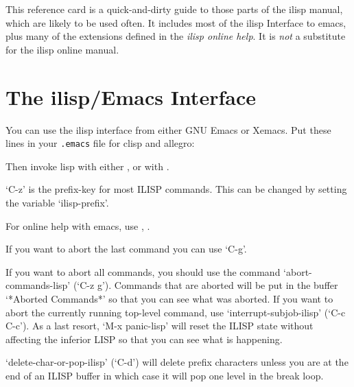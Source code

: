 This reference card is a quick-and-dirty guide to those parts of the
ilisp manual, which are likely to be used often.
It includes most of the ilisp Interface to emacs, plus many of the
extensions defined in the {\it ilisp online help}.  It is {\it not} a
substitute for the ilisp online manual.

\section{The ilisp/Emacs Interface }

You can use the ilisp interface from either GNU Emacs or Xemacs.  
Put these lines in your {\tt .emacs} file for clisp and allegro:


\hskip 25pt 
	 


\hskip 25pt 



\hskip 25pt 


Then invoke lisp with either , 
or with .

`C-z' is the prefix-key for most ILISP commands. This can be changed by 
setting the variable `ilisp-prefix'.

For online help with emacs, use , .


If you want to abort the last command you can use `C-g'.

If you want to abort all commands, you should use the command
`abort-commands-lisp' (`C-z g').  Commands that are aborted will be put
in the buffer `*Aborted Commands*' so that you can see what was
aborted.  If you want to abort the currently running top-level command,
use `interrupt-subjob-ilisp' (`C-c C-c').  As a last resort, `M-x
panic-lisp' will reset the ILISP state without affecting the inferior
LISP so that you can see what is happening.

   `delete-char-or-pop-ilisp' (`C-d') will delete prefix characters
unless you are at the end of an ILISP buffer in which case it will pop
one level in the break loop.

